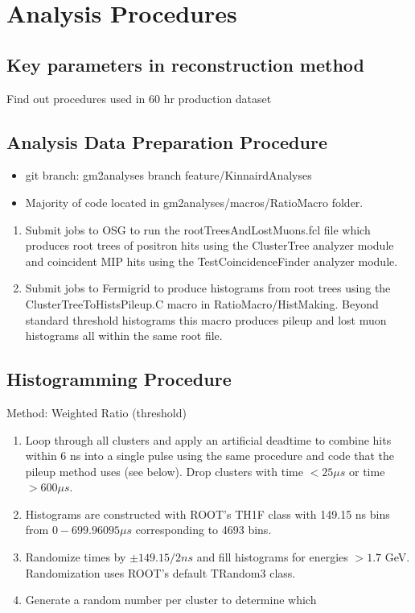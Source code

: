 \chapter{Analysis Procedures}

\section{Key parameters in reconstruction method}

Find out procedures used in 60 hr production dataset

\section{Analysis Data Preparation Procedure}

\begin{itemize}
	\item{git branch: gm2analyses branch feature/KinnairdAnalyses}
	\item{Majority of code located in gm2analyses/macros/RatioMacro folder.}
\end{itemize}

\begin{enumerate}
	\item{Submit jobs to OSG to run the rootTreesAndLostMuons.fcl file which produces root trees of positron hits using the ClusterTree analyzer module and coincident MIP hits using the TestCoincidenceFinder analyzer module.}
	\item{Submit jobs to Fermigrid to produce histograms from root trees using the ClusterTreeToHistsPileup.C macro in RatioMacro/HistMaking. Beyond standard threshold histograms this macro produces pileup and lost muon histograms all within the same root file.}
\end{enumerate}

\section{Histogramming Procedure}

Method: Weighted Ratio (threshold)

\begin{enumerate}
	\item{Loop through all clusters and apply an artificial deadtime to combine hits within 6 ns into a single pulse using the same procedure and code that the pileup method uses (see below). Drop clusters with time $< 25 \mu s$ or time $> 600 \mu s$.}
	\item{Histograms are constructed with ROOT's TH1F class with 149.15 ns bins from $0 - 699.96095 \mu s$ corresponding to 4693 bins.}
	\item{Randomize times by $\pm 149.15/2 ns$ and fill histograms for energies $> 1.7$ GeV. Randomization uses ROOT's default TRandom3 class.}
	\item{Generate a random number per cluster to determine which }
\end{enumerate}

